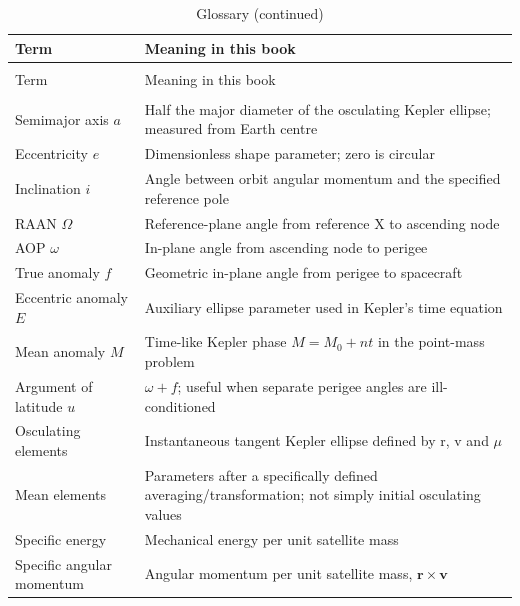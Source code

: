 \documentclass[10pt,a4paper]{article}
\numberwithin{equation}{section}
\begin{document}
\begingroup\fontsize{9.2}{11.6}\selectfont
\setlength{\tabcolsep}{4pt}\renewcommand{\arraystretch}{1.14}
\begin{longtable}{@{}>{\raggedright\arraybackslash}p{}>{\raggedright\arraybackslash}p{}@{}}
\caption{Glossary}\label{tab:book-35}\\
\toprule\rowcolor{headerbg}Term & Meaning in this book \\\midrule
\endfirsthead
\caption[]{Glossary (continued)}\\
\toprule\rowcolor{headerbg}Term & Meaning in this book \\\midrule
\endhead
\midrule\multicolumn{2}{r}{\textit{Continued on next page}}\\
\endfoot
\bottomrule\endlastfoot
Semimajor axis \(a\) & Half the major diameter of the osculating Kepler ellipse; measured from Earth centre \\
\rowcolor{rowalt}Eccentricity \(e\) & Dimensionless shape parameter; zero is circular \\
Inclination \(i\) & Angle between orbit angular momentum and the specified reference pole \\
\rowcolor{rowalt}RAAN \(\Omega\) & Reference-plane angle from reference X to ascending node \\
AOP \(\omega\) & In-plane angle from ascending node to perigee \\
\rowcolor{rowalt}True anomaly \(f\) & Geometric in-plane angle from perigee to spacecraft \\
Eccentric anomaly \(E\) & Auxiliary ellipse parameter used in Kepler's time equation \\
\rowcolor{rowalt}Mean anomaly \(M\) & Time-like Kepler phase \(M=M_0+nt\) in the point-mass problem \\
Argument of latitude \(u\) & \(\omega+f\); useful when separate perigee angles are ill-conditioned \\
\rowcolor{rowalt}Osculating elements & Instantaneous tangent Kepler ellipse defined by r, v and \(\mu\) \\
Mean elements & Parameters after a specifically defined averaging/transformation; not simply initial osculating values \\
\rowcolor{rowalt}Specific energy & Mechanical energy per unit satellite mass \\
Specific angular momentum & Angular momentum per unit satellite mass, \(\mathbf r\times\mathbf v\) \\

\end{longtable}
\end{document}
